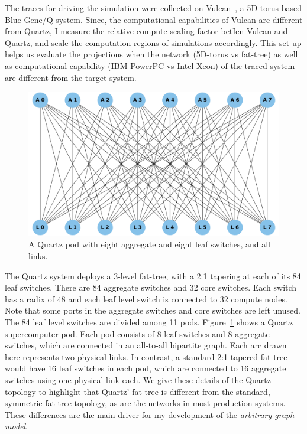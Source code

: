 The traces for driving the simulation were collected on
Vulcan~\cite{vulcan}, a 5D-torus based Blue Gene/Q
system.  Since, the computational capabilities of Vulcan are different from
Quartz, I measure the relative compute scaling factor betIen Vulcan and
Quartz, and scale the computation regions of simulations accordingly. This
set up helps us evaluate the projections when the network (5D-torus vs fat-tree)
as well as computational capability (IBM PowerPC vs Intel Xeon) of the traced
system are different from the target system.

\begin{figure}[h]
  \centering
  \includegraphics[width=0.8\columnwidth]{figure/val/quartztopo.pdf}
  \caption{A Quartz pod with eight aggregate and eight leaf switches, and all links.}
  \label{fig:quartz_pod}
\end{figure}

\vspace{0.08in}
 The Quartz system deploys a 3-level fat-tree, with a 2:1
tapering at each of its 84 leaf switches. There are 84 aggregate switches and 32
core switches. Each switch has a radix of 48 and each leaf level switch is
connected to 32 compute nodes.  Note that some ports in the aggregate switches
and core switches are left unused.  The 84 leaf level switches are divided among 
11 pods. Figure~\ref{fig:quartz_pod} shows a Quartz supercomputer pod.  Each pod consists 
of 8 leaf switches and 8 aggregate switches, which are connected in an
all-to-all bipartite graph. Each arc drawn here represents two physical links. 
In contrast, a standard 2:1 tapered fat-tree would have 16 leaf switches in 
each pod, which are connected to 16 aggregate switches using one physical link
each. We give these details of the Quartz topology to highlight that
Quartz' fat-tree is different from the standard, symmetric fat-tree topology,
as are the networks in most production systems. These differences are the main driver
for my development of the {\em arbitrary graph model}. 

